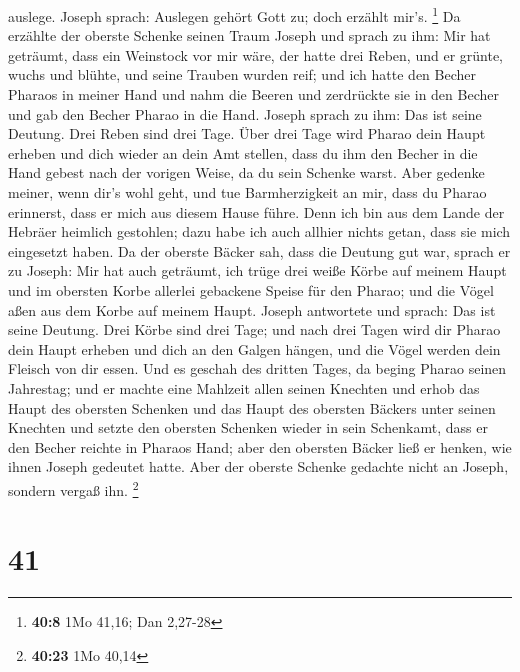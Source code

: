 auslege. Joseph sprach: Auslegen gehört Gott zu; doch erzählt mir's.
\footnote{\textbf{40:8} 1Mo 41,16; Dan 2,27-28}  Da
erzählte der oberste Schenke seinen Traum Joseph und sprach zu ihm: Mir
hat geträumt, dass ein Weinstock vor mir wäre,  der hatte
drei Reben, und er grünte, wuchs und blühte, und seine Trauben wurden
reif;  und ich hatte den Becher Pharaos in meiner Hand
und nahm die Beeren und zerdrückte sie in den Becher und gab den Becher
Pharao in die Hand.  Joseph sprach zu ihm: Das ist seine
Deutung. Drei Reben sind drei Tage.  Über drei Tage wird
Pharao dein Haupt erheben und dich wieder an dein Amt stellen, dass du
ihm den Becher in die Hand gebest nach der vorigen Weise, da du sein
Schenke warst.  Aber gedenke meiner, wenn dir's wohl
geht, und tue Barmherzigkeit an mir, dass du Pharao erinnerst, dass er
mich aus diesem Hause führe.  Denn ich bin aus dem Lande
der Hebräer heimlich gestohlen; dazu habe ich auch allhier nichts getan,
dass sie mich eingesetzt haben.  Da der oberste Bäcker
sah, dass die Deutung gut war, sprach er zu Joseph: Mir hat auch
geträumt, ich trüge drei weiße Körbe auf meinem Haupt 
und im obersten Korbe allerlei gebackene Speise für den Pharao; und die
Vögel aßen aus dem Korbe auf meinem Haupt.  Joseph
antwortete und sprach: Das ist seine Deutung. Drei Körbe sind drei Tage;
 und nach drei Tagen wird dir Pharao dein Haupt erheben
und dich an den Galgen hängen, und die Vögel werden dein Fleisch von dir
essen.  Und es geschah des dritten Tages, da beging
Pharao seinen Jahrestag; und er machte eine Mahlzeit allen seinen
Knechten und erhob das Haupt des obersten Schenken und das Haupt des
obersten Bäckers unter seinen Knechten  und setzte den
obersten Schenken wieder in sein Schenkamt, dass er den Becher reichte
in Pharaos Hand;  aber den obersten Bäcker ließ er
henken, wie ihnen Joseph gedeutet hatte.  Aber der
oberste Schenke gedachte nicht an Joseph, sondern vergaß ihn.
\footnote{\textbf{40:23} 1Mo 40,14}

\hypertarget{section-9}{%
\section{41}\label{section-9}}

